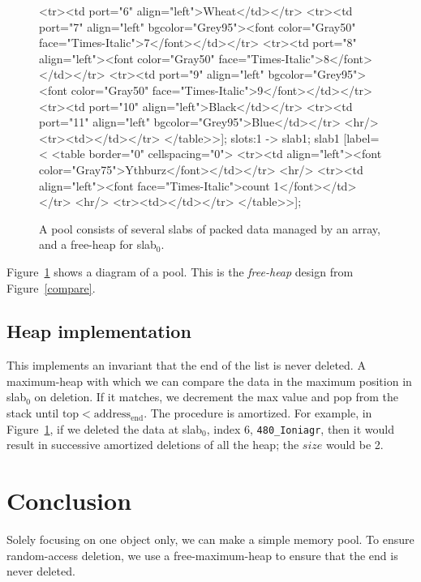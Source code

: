 \documentclass[12pt]{article}
\newcommand{\code}[1]{\colorbox{light-gray}{\texttt{#1}}}
\begin{document}
\begin{figure}
{	<tr><td port="6" align="left">Wheat</td></tr>
	<tr><td port="7" align="left" bgcolor="Grey95"><font color="Gray50" face="Times-Italic">7</font></td></tr>
	<tr><td port="8" align="left"><font color="Gray50" face="Times-Italic">8</font></td></tr>
	<tr><td port="9" align="left" bgcolor="Grey95"><font color="Gray50" face="Times-Italic">9</font></td></tr>
	<tr><td port="10" align="left">Black</td></tr>
	<tr><td port="11" align="left" bgcolor="Grey95">Blue</td></tr>
	<hr/>
	<tr><td></td></tr>
</table>>];
	slots:1 -> slab1;
	slab1 [label=<
<table border="0" cellspacing="0">
	<tr><td align="left"><font color="Gray75">Ythburz</font></td></tr>
	<hr/>
	<tr><td align="left"><font face="Times-Italic">count 1</font></td></tr>
	<hr/>
	<tr><td></td></tr>
</table>>];
	}
	\caption{A pool consists of several slabs of packed data managed by an array, and a free-heap for slab$_0$.}
	\label{pool}
\end{figure}

Figure~\ref{pool} shows a diagram of a pool. This is the {\it free-heap} design from Figure~\ref{compare}.

\subsection{Heap implementation}

This implements an invariant that the end of the list is never deleted. A maximum-heap with which we can compare the data in the maximum position in slab$_0$ on deletion. If it matches, we decrement the max value and pop from the stack until $\text{top} < \text{address}_\text{end}$. The procedure is amortized. For example, in Figure~\ref{pool}, if we deleted the data at slab$_0$, index 6, \code{480\_Ioniagr}, then it would result in successive amortized deletions of all the heap; the $size$ would be 2.


\section{Conclusion}

Solely focusing on one object only, we can make a simple memory pool. To ensure random-access deletion, we use a free-maximum-heap to ensure that the end is never deleted.


\end{document}
